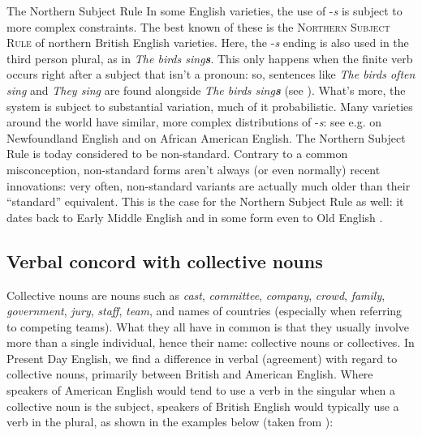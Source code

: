 \begin{miscbox}{The Northern Subject Rule}  
In some English varieties, the use of -\emph{s} is subject to more complex constraints. The best known of these is the \textsc{Northern Subject Rule} of northern British English varieties. Here, the -\emph{s} ending is also used in the third person plural, as in \textit{The birds sing\textbf{s}}. This only happens when the finite verb occurs right after a subject that isn't a pronoun: so, sentences like \textit{The birds often sing} and \textit{They sing} are found alongside \textit{The birds sing\textbf{s}} (see \citealp{DeHaasVanKemenade2014}). What's more, the system is subject to substantial variation, much of it probabilistic. Many varieties around the world have similar, more complex distributions of -\emph{s}: see e.g. \citet{Clarke1997} on Newfoundland English and \citet{Cukor-Avila1997} on African American English. The Northern Subject Rule is today considered to be non-standard. Contrary to a common misconception, non-standard forms aren't always (or even normally) recent innovations: very often, non-standard variants are actually much older than their ``standard'' equivalent. This is the case for the Northern Subject Rule as well: it dates back to Early Middle English \citep{DeHaasVanKemenade2014} and in some form even to Old English \citep{Cole2017}.
\end{miscbox}


\subsection{Verbal concord with collective nouns}\label{Vconc}
Collective nouns are nouns such as \emph{cast}, \emph{committee}, \emph{company}, \emph{crowd}, \emph{family}, \emph{government}, \emph{jury}, \emph{staff}, \emph{team}, and names of countries (especially when referring to competing teams). What they all have in common is that they usually involve more than a single individual, hence their name: collective nouns or collectives. In Present Day English, we find a difference in verbal  (agreement) with regard to collective nouns, primarily between British and American English. Where speakers of American English would tend to use a verb in the singular when a collective noun is the subject, speakers of British English would typically use a verb in the plural, as shown in the examples below (taken from \citealp[337]{Butters2001}):

